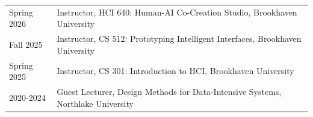 %
%
%


\begin{longtable}{@{}p{}p{}}


Spring 2026 & Instructor, HCI 640: Human-AI Co-Creation Studio, Brookhaven University \\

Fall 2025 & Instructor, CS 512: Prototyping Intelligent Interfaces, Brookhaven University \\

Spring 2025 & Instructor, CS 301: Introduction to HCI, Brookhaven University \\

2020-2024 & Guest Lecturer, Design Methods for Data-Intensive Systems, Northlake University \\

\end{longtable}

